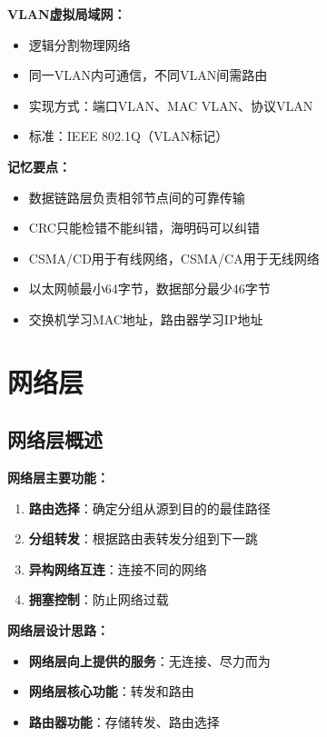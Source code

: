 \documentclass[lang=cn,newtx,10pt,scheme=chinese]{../../elegantbook}
\begin{document}
\textbf{VLAN虚拟局域网：}
\begin{itemize}
  \item 逻辑分割物理网络
  \item 同一VLAN内可通信，不同VLAN间需路由
  \item 实现方式：端口VLAN、MAC VLAN、协议VLAN
  \item 标准：IEEE 802.1Q（VLAN标记）
\end{itemize}

\textbf{记忆要点：}
\begin{itemize}
  \item 数据链路层负责相邻节点间的可靠传输
  \item CRC只能检错不能纠错，海明码可以纠错
  \item CSMA/CD用于有线网络，CSMA/CA用于无线网络
  \item 以太网帧最小64字节，数据部分最少46字节
  \item 交换机学习MAC地址，路由器学习IP地址
\end{itemize}

\chapter{网络层}

\section{网络层概述}

\textbf{网络层主要功能：}
\begin{enumerate}
  \item \textbf{路由选择}：确定分组从源到目的的最佳路径
  \item \textbf{分组转发}：根据路由表转发分组到下一跳
  \item \textbf{异构网络互连}：连接不同的网络
  \item \textbf{拥塞控制}：防止网络过载
\end{enumerate}

\textbf{网络层设计思路：}
\begin{itemize}
  \item \textbf{网络层向上提供的服务}：无连接、尽力而为
  \item \textbf{网络层核心功能}：转发和路由
  \item \textbf{路由器功能}：存储转发、路由选择
\end{itemize}
\end{document}
